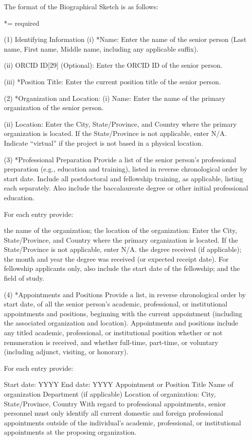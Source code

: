 {The format of the Biographical Sketch is as follows:

*= required

(1) Identifying Information
(i) *Name: Enter the name of the senior person (Last name, First name, Middle name, including any applicable suffix).

(ii) ORCID ID[29] (Optional): Enter the ORCID ID of the senior person.

(iii) *Position Title: Enter the current position title of the senior person.

(2) *Organization and Location:
(i) Name: Enter the name of the primary organization of the senior person.

(ii) Location: Enter the City, State/Province, and Country where the primary organization is located. If the State/Province is not applicable, enter N/A. Indicate “virtual” if the project is not based in a physical location.

(3) *Professional Preparation
Provide a list of the senior person’s professional preparation (e.g., education and training), listed in reverse chronological order by start date. Include all postdoctoral and fellowship training, as applicable, listing each separately. Also include the baccalaureate degree or other initial professional education.

For each entry provide:

the name of the organization;
the location of the organization: Enter the City, State/Province, and Country where the primary organization is located. If the State/Province is not applicable, enter N/A.
the degree received (if applicable);
the month and year the degree was received (or expected receipt date). For fellowship applicants only, also include the start date of the fellowship; and
the field of study.


(4) *Appointments and Positions
Provide a list, in reverse chronological order by start date, of all the senior person’s academic, professional, or institutional appointments and positions, beginning with the current appointment (including the associated organization and location). Appointments and positions include any titled academic, professional, or institutional position whether or not remuneration is received, and whether full-time, part-time, or voluntary (including adjunct, visiting, or honorary).

For each entry provide:

Start date: YYYY
End date: YYYY
Appointment or Position Title
Name of organization
Department (if applicable)
Location of organization: City, State/Province, Country
With regard to professional appointments, senior personnel must only identify all current domestic and foreign professional appointments outside of the individual's academic, professional, or institutional appointments at the proposing organization.

}
